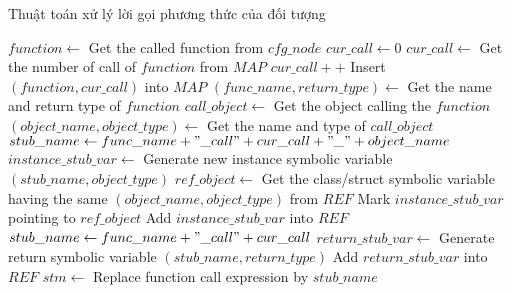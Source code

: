 \begin{algorithm}[!h]
    \small
    \caption{Thuật toán xử lý lời gọi phương thức của đối tượng}
    \label{alg:autostub-object}
    $function \leftarrow$ Get the called function from $cfg\_node$\;
    $cur\_call \leftarrow 0$\;
     {
        $cur\_call \leftarrow $ Get the number of call of $function$ from $MAP$\; 
    }
    $cur\_call++$\;
    Insert $(function, cur\_call)$ into $MAP$\;
    $(func\_name, return\_type) \leftarrow$ Get the name and return type of $function$\;
    $call\_object \leftarrow$ Get the object calling the $function$\;
     {
        $(object\_name, object\_type) \leftarrow$ Get the name and type of $call\_object$\;
        $stub\_name \leftarrow func\_name + "\_call" + cur\_call + "\_" + object\_name$\;
        $instance\_stub\_var \leftarrow$ Generate new instance symbolic variable $(stub\_name, object\_type)$\;
        $ref\_object \leftarrow$ Get the class/struct symbolic variable having the same $(object\_name, object\_type)$ from $REF$\;
        Mark $instance\_stub\_var$ pointing to $ref\_object$\;
        Add $instance\_stub\_var$ into $REF$\;
    }
     {
        $stub\_name \leftarrow func\_name + "\_call" + cur\_call$\;
        $return\_stub\_var \leftarrow$ Generate return symbolic variable $(stub\_name, return\_type)$\;
        Add $return\_stub\_var$ into $REF$\;
        $stm \leftarrow$ Replace function call expression by $stub\_name$\;
    }
\end{algorithm}

